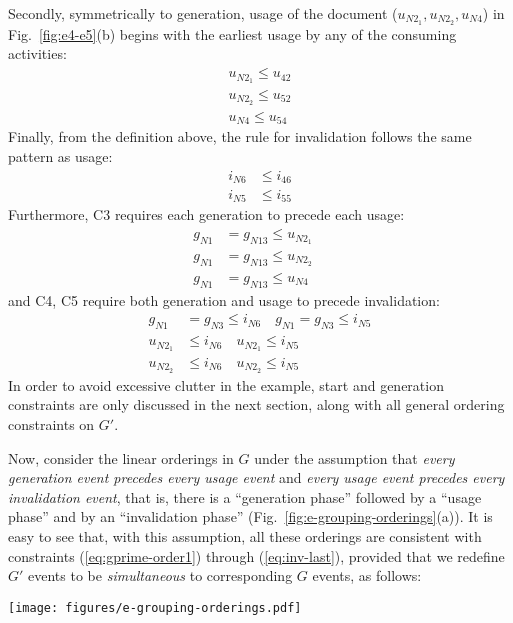 Secondly, symmetrically to generation, usage of the document ($u_{N2_1}, u_{N2_2}, u_{N4}$) in Fig.~\ref{fig:e4-e5}(b) begins with the earliest usage by any of the consuming activities:
\begin{align}
u_{N2_1} \leq u_{42} \label{eq:gen-usage1}\\
u_{N2_2} \leq u_{52}  \label{eq:gen-usage2}\\
u_{N4} \leq u_{54}  \label{eq:gen-usage3}
\end{align}
%
Finally, from the definition above, the rule for invalidation follows the same pattern as usage:
%
\begin{align}
i_{N6} &\leq i_{46} \label{eq:inv1}\\
i_{N5} &\leq i_{55}  \label{eq:inv2}
\end{align}
%
Furthermore, C3 requires each generation to precede each usage:
%
\begin{align}
g_{N1} &= g_{N13}  \leq  u_{N2_1}  \quad  \\
g_{N1} &= g_{N13}  \leq  u_{N2_2}  \quad  \\
g_{N1} &= g_{N13}  \leq  u_{N4}  \label{eq:gprime-order2}
\end{align}
%
and C4, C5 require both generation and usage to precede invalidation:
%
\begin{align}
g_{N1} &= g_{N3} \leq i_{N6}  \quad g_{N1} = g_{N3} \leq i_{N5} \\
u_{N2_1} &\leq i_{N6}  \quad u_{N2_1} \leq i_{N5} \\
u_{N2_2} &\leq i_{N6}  \quad u_{N2_2} \leq i_{N5} \label{eq:inv-last}
\end{align}
%
In order to avoid excessive clutter in the example, start and generation constraints are only discussed in the next section, along with all general ordering constraints on $G'$.


Now, consider the  linear orderings in $G$ under the assumption that \textit{every generation event precedes every usage event} and \textit{every usage event precedes every invalidation event}, that is, there is a ``generation phase'' followed by a ``usage phase'' and by an ``invalidation phase'' (Fig.~\ref{fig:e-grouping-orderings}(a)). It is easy to see that, with this assumption, all these orderings are consistent with constraints (\ref{eq:gprime-order1}) through (\ref{eq:inv-last}), provided that we redefine $G'$ events to be \textit{simultaneous} to corresponding $G$ events, as follows:

\begin{figure*}
\centering
\texttt{[image: figures/e-grouping-orderings.pdf]} 
\caption{Two possible orderings on $G$ (top), and corresponding orderings on $G'$ (bottom)} \label{fig:e-grouping-orderings}
\end{figure*}


